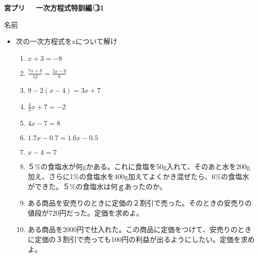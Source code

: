 \documentclass[a4paper,fleqn,papersize,15pt]{jsarticle}
\begin{document}
\clearpage
 \begin{center}
   \LARGE\textbf{宮プリ　~一次方程式特訓編~\textcircled{\scriptsize 11}}
     \begin{flushright}
       名前\underline{\hspace{8zw}}
     \end{flushright}
 \end{center}

 \begin{itemize}
   \item 次の一次方程式をxについて解け
   \begin{enumerate}
\item $x+3=-8$ \begin{flushright}\framebox[8em]{\rule{0pt}{6ex}}\end{flushright} %
\item $\frac{7x+8}{12} = \frac{5x-9}{8}$ \begin{flushright}\framebox[8em]{\rule{0pt}{6ex}}\end{flushright} %
\item $9-2(x-4)=3x+7$ \begin{flushright}\framebox[8em]{\rule{0pt}{6ex}}\end{flushright} %
\item $\frac{4}{3} x+7=-2$ \begin{flushright}\framebox[8em]{\rule{0pt}{6ex}}\end{flushright} %
\item $4x-7=8$ \begin{flushright}\framebox[8em]{\rule{0pt}{6ex}}\end{flushright} %
\item $1.7x-0.7=1.6x-0.5$ \begin{flushright}\framebox[8em]{\rule{0pt}{6ex}}\end{flushright} %
\item $x-4=7$ \begin{flushright}\framebox[8em]{\rule{0pt}{6ex}}\end{flushright} %
\item ５\%の食塩水が何gかある。これに食塩を50g入れて、そのあと水を200g加え、さらに1\%の食塩水を400g加えてよくかき混ぜたら、6\%の食塩水ができた。５\%の食塩水は何ｇあったのか。 \vfill \begin{flushright}\framebox[8em]{\rule{0pt}{6ex}}\end{flushright} %
\item ある商品を安売りのときに定価の２割引で売った。そのときの安売りの値段が720円だった。定価を求めよ。 \vfill \begin{flushright}\framebox[8em]{\rule{0pt}{6ex}}\end{flushright} %
\item ある商品を2000円で仕入れた。この商品に定価をつけて、安売りのときに定価の３割引で売っても100円の利益が出るようにしたい。定価を求めよ。 \vfill \begin{flushright}\framebox[8em]{\rule{0pt}{6ex}}\end{flushright} %
\end{enumerate}
    \vfill
\end{itemize}
\end{document}
